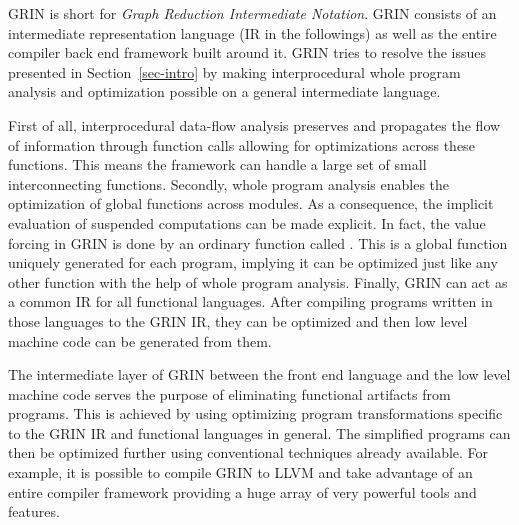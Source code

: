 \documentclass[main.tex]{subfiles}
\begin{document}
	
	GRIN is short for \emph{Graph Reduction Intermediate Notation}. GRIN consists of an intermediate representation language (IR in the followings) as well as the entire compiler back end framework built around it. GRIN tries to resolve the issues presented in Section~\ref{sec-intro} by making interprocedural whole program analysis and optimization possible on a general intermediate language. 
	
	First of all, interprocedural data-flow analysis preserves and propagates the flow of information through function calls allowing for optimizations across these functions. This means the framework can handle a large set of small interconnecting functions. Secondly, whole program analysis enables the optimization of global functions across modules. As a consequence, the implicit evaluation of suspended computations can be made explicit. In fact, the value forcing in GRIN is done by an ordinary function called . This is a global function uniquely generated for each program, implying it can be optimized just like any other function with the help of whole program analysis. Finally, GRIN can act as a common IR for all functional languages. After compiling programs written in those languages to the GRIN IR, they can be optimized and then low level machine code can be generated from them.
	
	The intermediate layer of GRIN between the front end language and the low level machine code serves the purpose of eliminating functional artifacts from programs. This is achieved by using optimizing program transformations specific to the GRIN IR and functional languages in general. The simplified programs can then be optimized further using conventional techniques already available. For example, it is possible to compile GRIN to LLVM and take advantage of an entire compiler framework providing a huge array of very powerful tools and features.
	
	
\end{document}
